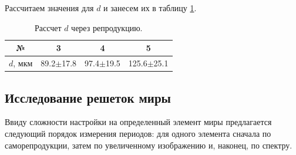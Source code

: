 \documentclass[a4paper, 12pt]{article}
\begin{document}
	 Рассчитаем значения для $d$ и занесем их в таблицу \ref{table:reproduct_net}.\par
	 \begin{table}[h!]
	 	\centering
	 	\begin{tabular}{|c|c|c|c|}
	 		\hline
	 		№ & 3 & 4 & 5\\
	 		\hline
	 		$d$, мкм & 89.2$\pm$17.8 & 97.4$\pm$19.5 & 125.6$\pm$25.1\\
	 		\hline
	 	\end{tabular}
	 	\caption{Рассчет $d$ через репродукцию.}
	 	\label{table:reproduct_net}
	 \end{table}
	 \subsection{Исследование решеток миры}
	 Ввиду сложности настройки на определенный элемент миры предлагается следующий порядок измерения периодов: для одного элемента сначала по саморепродукции, затем по увеличенному изображению и, наконец, по спектру.
\end{document}
